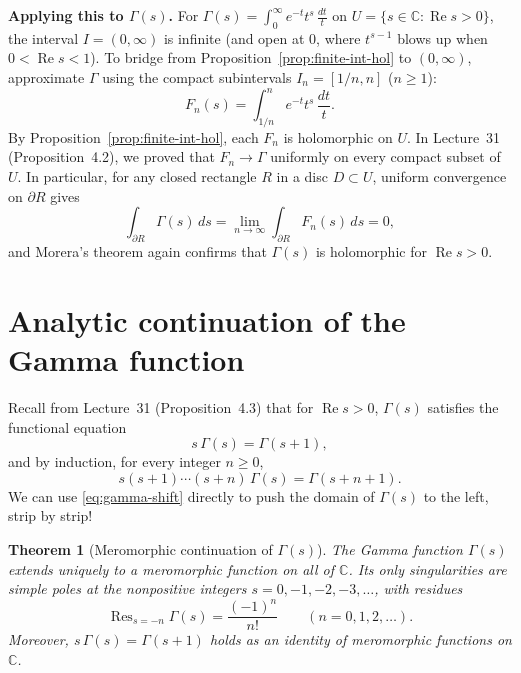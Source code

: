 \documentclass[11pt]{article}
\theoremstyle{plain}
\newtheorem{theorem}{Theorem}[section]
\theoremstyle{definition}
\theoremstyle{boldremark}
\theoremstyle{remark}
\numberwithin{equation}{section}
\newcommand{\C}{\mathbb{C}}
\DeclareMathOperator{\Real}{Re}
\begin{document}
\textbf{Applying this to $\Gamma(s)$.}
For $\Gamma(s)=\int_0^{\infty} e^{-t}t^{s}\,\frac{dt}{t}$ on
$U=\{s\in\C:\Real s > 0\}$, the interval $I=(0,\infty)$ is infinite (and
open at $0$, where $t^{s-1}$ blows up when $0<\Real s < 1$). To bridge from
Proposition~\ref{prop:finite-int-hol} to $(0,\infty)$, approximate $\Gamma$
using the compact subintervals $I_n=[1/n, n]$ ($n\geq 1$):
\[
 F_n(s) = \int_{1/n}^{n} e^{-t}t^{s}\,\frac{dt}{t}.
\]
By Proposition~\ref{prop:finite-int-hol}, each $F_n$ is holomorphic on $U$.
In Lecture~31 (Proposition~4.2), we proved that $F_n\to\Gamma$ uniformly on
every compact subset of $U$. In particular, for any closed rectangle $R$ in
a disc $D\subset U$, uniform convergence on $\partial R$ gives
\[
 \int_{\partial R}\Gamma(s)\,ds
 = \lim_{n\to\infty}\int_{\partial R} F_n(s)\,ds = 0,
\]
and Morera's theorem again confirms that $\Gamma(s)$ is holomorphic for
$\Real s > 0$.


\section{Analytic continuation of the Gamma function}

Recall from Lecture~31 (Proposition~4.3) that for $\Real s > 0$, $\Gamma(s)$
satisfies the functional equation
\begin{equation}\label{eq:gamma-shift}
 s\,\Gamma(s) = \Gamma(s+1),
\end{equation}
and by induction, for every integer $n\geq 0$,
\begin{equation}\label{eq:gamma-iter}
 s(s+1)\cdots(s+n)\,\Gamma(s) = \Gamma(s+n+1).
\end{equation}
We can use \eqref{eq:gamma-shift} directly to push the domain of
$\Gamma(s)$ to the left, strip by strip!

\begin{theorem}[Meromorphic continuation of $\Gamma(s)$]\label{thm:gamma-cont}
The Gamma function $\Gamma(s)$ extends uniquely to a meromorphic function
on all of $\C$. Its only singularities are simple poles at the nonpositive
integers $s=0,-1,-2,-3,\dots$, with residues
\[
 \operatorname{Res}_{s=-n}\Gamma(s) = \frac{(-1)^n}{n!}
 \qquad (n=0,1,2,\dots).
\]
Moreover, $s\,\Gamma(s)=\Gamma(s+1)$ holds as an identity of meromorphic
functions on $\C$.
\end{theorem}
\end{document}
